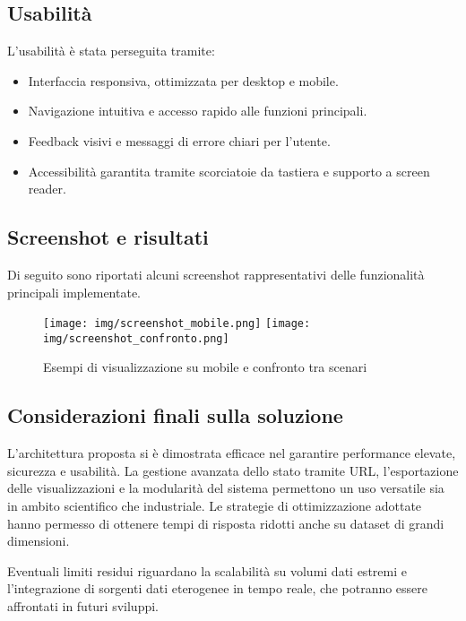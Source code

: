 \subsection{Usabilità}

L’usabilità è stata perseguita tramite:
\begin{itemize}
    \item Interfaccia responsiva, ottimizzata per desktop e mobile.
    \item Navigazione intuitiva e accesso rapido alle funzioni principali.
    \item Feedback visivi e messaggi di errore chiari per l’utente.
    \item Accessibilità garantita tramite scorciatoie da tastiera e supporto a screen reader.
\end{itemize}

\subsection{Screenshot e risultati}

Di seguito sono riportati alcuni screenshot rappresentativi delle funzionalità principali implementate.

\vspace{0.5cm}
\begin{figure}[h!]
    \centering
    \texttt{[image: img/screenshot\_mobile.png]}
    \hfill
    \texttt{[image: img/screenshot\_confronto.png]}
    \caption{Esempi di visualizzazione su mobile e confronto tra scenari}
    \label{fig:screenshot_extra}
\end{figure}
\vspace{0.5cm}

\subsection{Considerazioni finali sulla soluzione}

L’architettura proposta si è dimostrata efficace nel garantire performance elevate, sicurezza e usabilità. La gestione avanzata dello stato tramite URL, l’esportazione delle visualizzazioni e la modularità del sistema permettono un uso versatile sia in ambito scientifico che industriale. Le strategie di ottimizzazione adottate hanno permesso di ottenere tempi di risposta ridotti anche su dataset di grandi dimensioni.

Eventuali limiti residui riguardano la scalabilità su volumi dati estremi e l’integrazione di sorgenti dati eterogenee in tempo reale, che potranno essere affrontati in futuri sviluppi.


